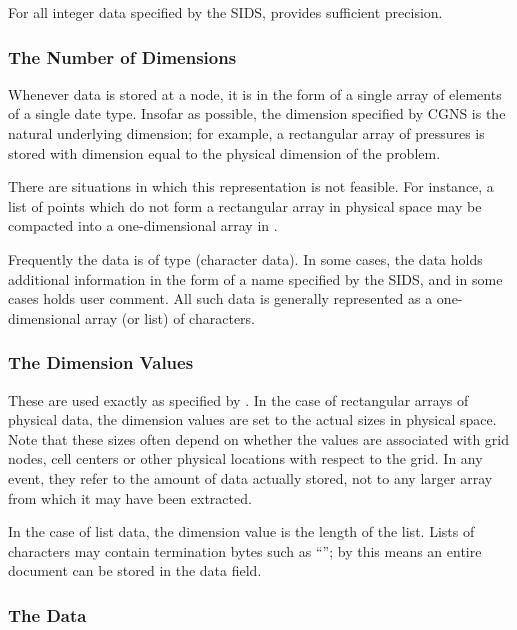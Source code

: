 For all integer data specified by the SIDS,  provides
sufficient precision. 


\subsubsection{The Number of Dimensions}

Whenever data is stored at a node, it is in the form of a single array
of elements of a single date type. Insofar as possible, the dimension
specified by CGNS is the natural underlying dimension; for example, a
rectangular array of pressures is stored with dimension equal to the
physical dimension of the problem.

There are situations in which this representation is not feasible. For
instance, a list of points which do not form a rectangular array in
physical space may be compacted into a one-dimensional array in \HDF.

Frequently the data is of type  (character data). In some
cases, the data holds additional information in the form of a name
specified by the SIDS, and in some cases holds user comment. All such
data is generally represented as a one-dimensional array (or list) of
characters.

\subsubsection{The Dimension Values}

These are used exactly as specified by \HDF. In the case of rectangular
arrays of physical data, the dimension values are set to the actual
sizes in physical space. Note that these sizes often depend on whether
the values are associated with grid nodes, cell centers or other
physical locations with respect to the grid. In any event, they refer to
the amount of data actually stored, not to any larger array from which
it may have been extracted.

In the case of list data, the dimension value is the length of the
list. Lists of characters may contain termination bytes such as
``''; by this means an entire document can be
stored in the data field.

\subsubsection{The Data}

